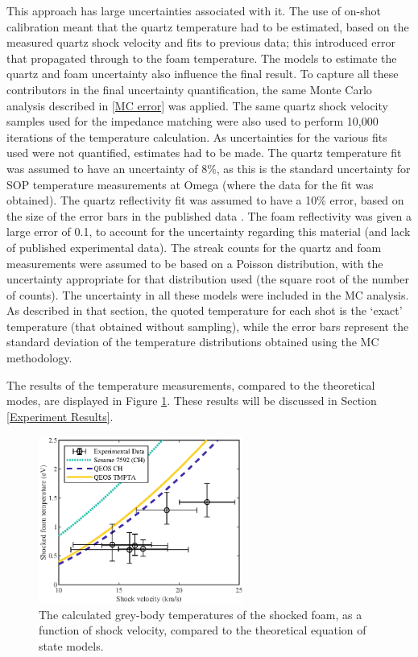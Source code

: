 This approach has large uncertainties associated with it. The use of on-shot calibration meant that the quartz temperature had to be estimated, based on the measured quartz shock velocity and fits to previous data; this introduced error that propagated through to the foam temperature. The models to estimate the quartz and foam uncertainty also influence the final result. To capture all these contributors in the final uncertainty quantification, the same Monte Carlo analysis described in \ref{MC error} was applied. The same quartz shock velocity samples used for the impedance matching were also used to perform 10,000 iterations of the temperature calculation. As uncertainties for the various fits used were not quantified, estimates had to be made. The quartz temperature fit was assumed to have an uncertainty of 8\%, as this is the standard uncertainty for SOP temperature measurements at Omega \cite{Millot2015} (where the data for the fit was obtained). The quartz reflectivity fit was assumed to have a 10\% error, based on the size of the error bars in the published data \cite{Millot2015}. The foam reflectivity was given a large error of 0.1, to account for the uncertainty regarding this material (and lack of published experimental data). The streak counts for the quartz and foam measurements were assumed to be based on a Poisson distribution, with the uncertainty appropriate for that distribution used (the square root of the number of counts). The uncertainty in all these models were included in the MC analysis. As described in that section, the quoted temperature for each shot is the `exact' temperature (that obtained without sampling), while the error bars represent the standard deviation of the temperature distributions obtained using the MC methodology.

The results of the temperature measurements, compared to the theoretical modes, are displayed in Figure \ref{fig:SOP Temp}. These results will be discussed in Section \ref{Experiment Results}.

\begin{figure} [h!]
\begin{centering}
\includegraphics[width=0.6\textwidth]{figures/Experiment/Temp.eps}%
\caption{\label{fig:SOP Temp} The calculated grey-body temperatures of the shocked foam, as a function of shock velocity, compared to the theoretical equation of state models.}
\end{centering}
\end{figure}

